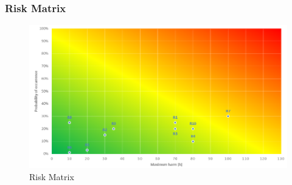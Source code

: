 \subsubsection{Risk Matrix}
\begin{figure}[H]
	\centering
	\includegraphics[width=1\textwidth]{img/riskmatrix}
	\caption{Risk Matrix}
	\label{fig:Risk Maxtrix}
\end{figure}